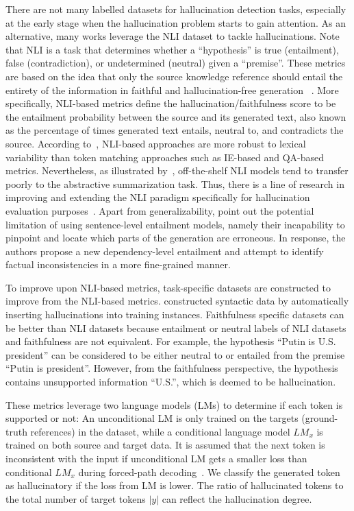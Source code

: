There are not many labelled datasets for hallucination detection tasks, especially at the early stage when the hallucination problem starts to gain attention. As an alternative, many works leverage the NLI dataset to tackle hallucinations. Note that NLI is a task that determines whether a “hypothesis” is true (entailment), false (contradiction), or undetermined (neutral) given a “premise”. These metrics are based on the idea that only the source knowledge reference should entail the entirety of the information in faithful and hallucination-free generation ~. 
More specifically, NLI-based metrics define the hallucination/faithfulness score to be the entailment probability between the source and its generated text, also known as the percentage of times generated text entails, neutral to, and contradicts the source. 
According to~, NLI-based approaches are more robust to lexical variability than token matching approaches such as IE-based and QA-based metrics. Nevertheless, as illustrated by~, off-the-shelf NLI models tend to transfer poorly to the abstractive summarization task. Thus, there is a line of research in improving and extending the NLI paradigm specifically for hallucination evaluation purposes~. Apart from generalizability,  point out the potential limitation of using sentence-level entailment models, namely their incapability to pinpoint and locate which parts of the generation are erroneous. In response, the authors propose a new dependency-level entailment and attempt to identify factual inconsistencies in a more fine-grained manner.

To improve upon NLI-based metrics, task-specific datasets are constructed to improve from the NLI-based metrics.
 constructed syntactic data by automatically inserting hallucinations into training instances. 
Faithfulness specific datasets can be better than NLI datasets because entailment or neutral labels of NLI datasets and faithfulness are not equivalent. 
For example, the hypothesis ``Putin is U.S. president'' can be considered to be either neutral to or entailed from the premise ``Putin is president''. However, from the faithfulness perspective, the hypothesis contains unsupported information ``U.S.'', which is deemed to be hallucination.

These metrics leverage two language models (LMs) to determine if each token is supported or not:
An unconditional LM is only trained on the targets (ground-truth references) in the dataset, while a conditional language model $LM_x$ is trained on both source and target data.
It is assumed that the next token is inconsistent with the input if unconditional LM gets a smaller loss than conditional $LM_x$ during forced-path decoding~. 
We classify the generated token as hallucinatory if the loss from LM is lower. The ratio of hallucinated tokens to the total number of target tokens $|y|$ can reflect the hallucination degree.

